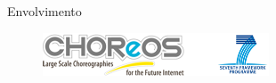 \documentclass[xcolor=svgnames]{beamer}
\begin{document}











    \begin{frame}{Envolvimento}
      \begin{figure}[!h]
          \centering
          \includegraphics[width=0.6\textwidth]{./figures/CHOReOSProject.png}
      \end{figure}	
    \end{frame}

 \begin{frame}
 \end{frame}
\end{document}
